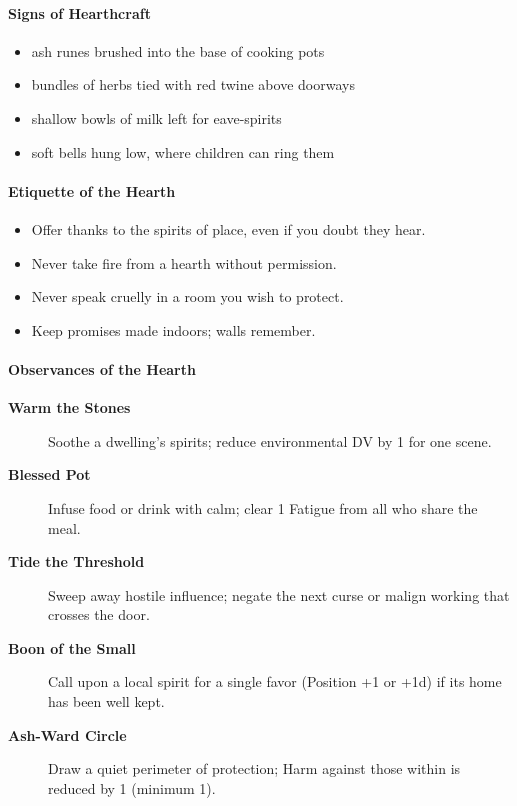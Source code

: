 \documentclass[11pt]{book}
\begin{document}
\paragraph{Signs of Hearthcraft}
\begin{itemize}
    \item ash runes brushed into the base of cooking pots
    \item bundles of herbs tied with red twine above doorways
    \item shallow bowls of milk left for eave-spirits
    \item soft bells hung low, where children can ring them
\end{itemize}

\paragraph{Etiquette of the Hearth}
\begin{itemize}
    \item Offer thanks to the spirits of place, even if you doubt they hear.
    \item Never take fire from a hearth without permission.
    \item Never speak cruelly in a room you wish to protect.
    \item Keep promises made indoors; walls remember.
\end{itemize}

\paragraph{Observances of the Hearth}
\begin{description}
    \item[\textbf{Warm the Stones}]  
    Soothe a dwelling's spirits; reduce environmental DV by 1 for one scene.

    \item[\textbf{Blessed Pot}]  
    Infuse food or drink with calm; clear 1 Fatigue from all who share the meal.

    \item[\textbf{Tide the Threshold}]  
    Sweep away hostile influence; negate the next curse or malign working that crosses the door.

    \item[\textbf{Boon of the Small}]  
    Call upon a local spirit for a single favor (Position +1 or +1d) if its home has been well kept.

    \item[\textbf{Ash-Ward Circle}]  
    Draw a quiet perimeter of protection; Harm against those within is reduced by 1 (minimum 1).
\end{description}
\end{document}
